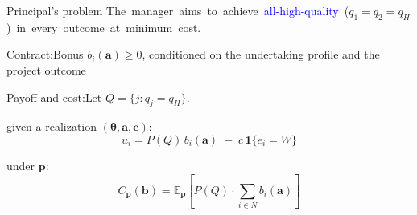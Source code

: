 \documentclass[10pt,aspectratio=169, compressed]{beamer}
\newcommand{\mathbbm}[1]{\mathbf{#1}}
\begin{document}
\begin{frame}{Principal's problem}
\mbox{The manager aims to achieve \textcolor{blue}{all-high-quality} ($q_1 = q_2 = q_H$)
in  {every outcome} {at} {minimum cost}.}

\bigskip


{Contract:}\quad Bonus $b_i(\mathbf{a}) \geq 0$, conditioned on {the undertaking profile} and {the project outcome}


\bigskip

{Payoff and cost:}\quad Let $Q = \{j : q_j = q_H\}$.
\medskip

\quad{} given a realization $(\boldsymbol{\theta}, \mathbf{a}, \mathbf{e})$:
$$u_i = P(Q)\,b_i(\mathbf a) \;-\; c\,\mathbbm 1\{e_i = W\}$$ 
\medskip

\quad{} under $\mathbf{p}$:
$$
C_{\mathbf p}(\mathbf{b}) = \mathbb{E}_{\mathbf{p}}\left[P(Q) \cdot \sum_{i \in N} b_i(\mathbf{a})\right]
$$


\end{frame}

\end{document}
